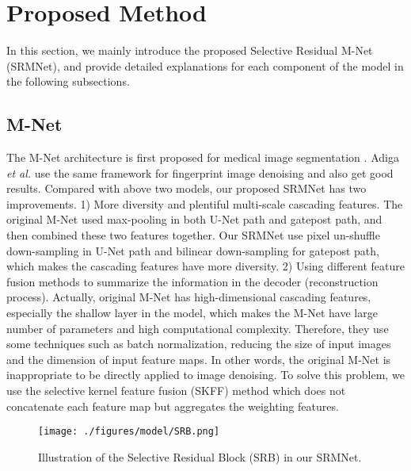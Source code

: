 \documentclass{article}
\begin{document}
\section{Proposed Method}
In this section, we mainly introduce the proposed Selective Residual M-Net (SRMNet), and provide detailed explanations for each component of the model in the following subsections.

\subsection{M-Net}
The M-Net architecture is first proposed for medical image segmentation \cite{mehta2017m}. Adiga \textit{et al.} \cite{adiga2019fpd} use the same framework for fingerprint image denoising and also get good results. Compared with above two models, our proposed SRMNet has two improvements. 1) More diversity and plentiful multi-scale cascading features. The original M-Net used  max-pooling in both U-Net path and gatepost path, and then combined these two features together. Our SRMNet use pixel un-shuffle down-sampling in U-Net path and bilinear down-sampling for gatepost path, which makes the cascading features have more diversity. 2) Using different feature fusion methods to summarize the information in the decoder (reconstruction process). Actually, original M-Net has high-dimensional cascading features, especially the shallow layer in the model, which makes the M-Net have large number of parameters and high computational complexity. Therefore, they use some techniques such as batch normalization, reducing the size of input images and the dimension of input feature maps. In other words, the original M-Net is inappropriate to be directly applied to image denoising. To solve this problem, we use the selective kernel feature fusion (SKFF) method \cite{20} which does not concatenate each feature map but aggregates the weighting features.



\begin{figure*}[htbp] 
	\centering
	\texttt{[image: ./figures/model/SRB.png]}
  \caption{Illustration of the Selective Residual Block (SRB) in our SRMNet.}
  \label{SRB}
\end{figure*}
\end{document}
